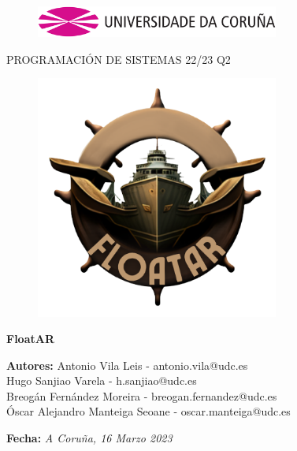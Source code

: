 \documentclass[a4paper, openright, 12pt]{article}
\begin{document}
\begin{titlepage}

\begin{center}
\vspace*{-1in}
\begin{figure}[htb]
\begin{center}
\includegraphics[width=8cm]{udc.eps}
\end{center}
\end{figure}

\vspace*{1in}
PROGRAMACIÓN DE SISTEMAS 22/23 Q2\\
\begin{figure}[htb]
\begin{center}
\includegraphics[width=8cm]{icono.png}
\end{center}
\end{figure}
\begin{Large}
\textbf{FloatAR} \\
\end{Large}

\vspace*{1.5in}

\begin{large}
\raggedleft
\textbf{Autores:}
{Antonio Vila Leis - antonio.vila@udc.es\\Hugo Sanjiao Varela - h.sanjiao@udc.es\\Breogán Fernández Moreira - breogan.fernandez@udc.es\\Óscar Alejandro Manteiga Seoane - oscar.manteiga@udc.es\\}

\vspace{1in}

\textbf{Fecha:}\textit{ A Coruña, 16 Marzo 2023}\\
\end{large}

\end{center}
\end{titlepage} 
\end{document}
